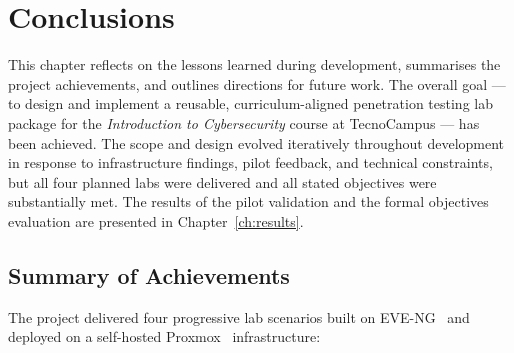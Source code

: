 
\chapter{Conclusions}
\label{ch:conclusions}

This chapter reflects on the lessons learned during development, summarises the
project achievements, and outlines directions for future work. The overall goal ---
to design and implement a reusable, curriculum-aligned penetration testing lab
package for the \textit{Introduction to Cybersecurity} course at TecnoCampus ---
has been achieved. The scope and design evolved iteratively throughout development
in response to infrastructure findings, pilot feedback, and technical constraints,
but all four planned labs were delivered and all stated objectives were substantially
met. The results of the pilot validation and the formal objectives evaluation are
presented in Chapter~\ref{ch:results}.

\section{Summary of Achievements}

The project delivered four progressive lab scenarios built on EVE-NG~\cite{eve_ng}
and deployed on a self-hosted Proxmox~\cite{proxmox} infrastructure:

